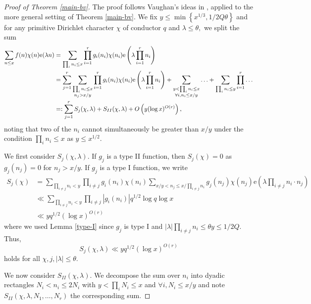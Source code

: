 \documentclass{article}
\newcommand{\e}{\mathrm{e}}
\begin{document}
\begin{proof}[Proof of Theorem \ref{main-bv}]
    The proof follows Vaughan's ideas in \cite{vaughan-bv}, applied to the more general setting of Theorem \ref{main-bv}. We fix $y\le \min\left\{x^{1/3}, 1/2Q\theta\right\}$ and for any primitive Dirichlet character $\chi$ of conductor $q$ and $\lambda \le \theta,$ we split the sum 
    \begin{align}
        \sum_{n\le x} f(n) \chi(n) \e(\lambda n) &= \sum_{\prod_i n_i \le x} \prod_{i=1}^r g_i(n_i) \chi(n_i) \e\left(\lambda \prod_{i=1}^r n_i\right) \notag
        \\&= \sum_{j=1}^r \sum_{\substack{\prod_i n_i \le x \\ n_j > x/y}} \prod_{i=1}^r g_i(n_i) \chi(n_i) \e\left(\lambda \prod_{i=1}^r n_i\right) + \sum_{\substack{y < \prod_i n_i \le x \\ \forall i, n_i \le x/y}} \ldots + \sum_{\prod_i n_i \le y} \prod_{i=1}^r \ldots \notag
        \\&=: \sum_{j=1}^r S_j(\chi,\lambda) + S_{II}(\chi,\lambda) + O\left(y(\log x)^{O(r)}\right), \label{sum-decomp}
    \end{align}
    noting that two of the $n_i$ cannot simultaneously be greater than $x/y$ under the condition $\prod_i n_i \le x$ as $y\le x^{1/2}.$ 

    We first consider $S_j(\chi,\lambda).$ If $g_j$ is a type II function, then $S_j(\chi) = 0$ as $g_j(n_j) = 0$ for $n_j > x/y.$ If $g_j$ is a type I function, we write 
    \begin{align*}
        S_j(\chi) &= \sum_{\prod_{i\ne j} n_i < y} \prod_{i\ne j} g_i(n_i)\chi(n_i) \sum_{x/y < n_j \le x/\prod_{i\ne j} n_i} g_j(n_j) \chi(n_j) \e\left(\lambda \prod_{i\ne j}n_i \cdot n_j \right)
        \\&\ll \sum_{\prod_{i\ne j} n_i < y} \prod_{i\ne j} |g_i(n_i)| q^{1/2} \log q \log x
        \\&\ll y q^{1/2} (\log x)^{O(r)}
    \end{align*}
    where we used Lemma \ref{type-I} since $g_j$ is type I and $|\lambda| \prod_{i\ne j} n_i \le \theta y \le 1/2Q.$
    Thus, \begin{equation}\label{sum-I}
        S_j(\chi,\lambda) \ll y q^{1/2} (\log x)^{O(r)}
    \end{equation} holds for all $\chi, j, |\lambda| \le \theta.$

    We now consider $S_{II}(\chi,\lambda).$ We decompose the sum over $n_i$ into dyadic rectangles $N_i < n_i \le 2N_i$ with $y < \prod_i N_i \le x$ and $\forall i, N_i \le x/y$ and note $S_{II}(\chi,\lambda, N_1, \ldots, N_r)$ the corresponding sum.


\end{proof}
\end{document}
